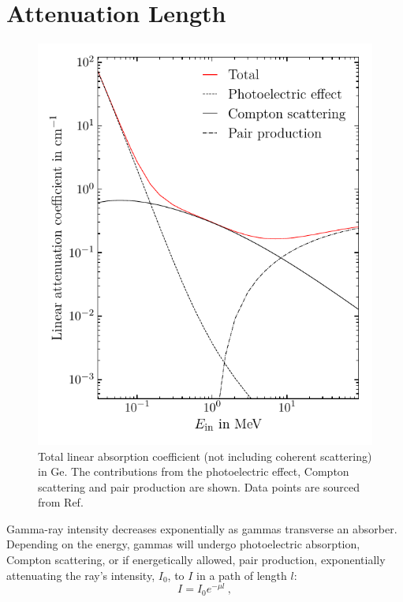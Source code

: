 \section{Attenuation Length}
\begin{figure}[htb]
	\centering
	\includegraphics{figs/gammas/linear_attenuation_ge_width_4in.pdf}
	\caption{Total linear absorption coefficient (not including coherent scattering) in Ge. The contributions from the photoelectric effect, Compton scattering and pair production are shown. Data points are sourced from Ref.~\cite{NIST}}
	\label{fig:attenuation}
\end{figure}
Gamma-ray intensity decreases exponentially as gammas transverse an absorber. Depending on the energy, gammas will undergo photoelectric absorption, Compton scattering, or if energetically allowed, pair production, exponentially attenuating the ray's intensity, $I_0$, to $I$ in a path of length $l$:
\begin{equation}
	I = I_0e^{-\mu l}~,
\label{eq:attenuation_length}
\end{equation}
